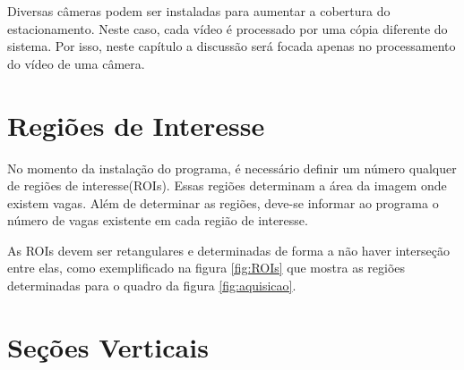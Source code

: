 Diversas câmeras podem ser instaladas para aumentar a cobertura do estacionamento. Neste caso, cada vídeo é processado por uma cópia diferente do sistema. Por isso, neste capítulo a discussão será focada apenas no processamento do vídeo de uma câmera.

\section{Regiões de Interesse}\label{sec:ROIs}

No momento da instalação do programa, é necessário definir um número qualquer de regiões de interesse(ROIs). Essas regiões determinam a área da imagem onde existem vagas. Além de determinar as regiões, deve-se informar ao programa o número de vagas existente em cada região de interesse.

As ROIs devem ser retangulares e determinadas de forma a não haver interseção entre elas, como exemplificado na figura \ref{fig:ROIs} que mostra as regiões determinadas para o quadro da figura \ref{fig:aquisicao}.


\section{Seções Verticais}\label{sec:secoesVerticais}

 






